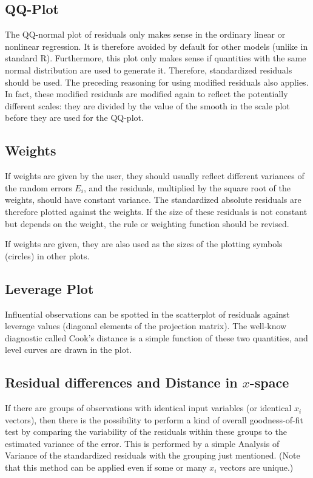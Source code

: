 \documentclass[11pt]{article}\usepackage[]{graphicx}\usepackage[]{color}
\begin{document}
\subsection{QQ-Plot}
The QQ-normal plot of residuals only makes sense in the ordinary linear or
nonlinear regression. It is therefore avoided by default for other models 
(unlike in standard R).
Furthermore, this plot only makes sense if quantities with the same normal
distribution are used to generate it. 
Therefore, standardized residuals should be used.
The preceding reasoning for using modified residuals also applies.
In fact, these modified residuals are modified again to reflect the
potentially different scales: they are divided by the value of the smooth
in the scale plot before they are used for the QQ-plot.

\subsection{Weights}
If weights are given by the user, they should usually reflect different
variances of the random errors $E_i$, and the residuals, multiplied by the
square root of the weights, should have constant variance.
The standardized absolute residuals are therefore plotted against the weights.
If the size of these residuals is not constant but depends on the weight, 
the rule or weighting function should be revised.

If weights are given, they are also used as the sizes of the plotting
symbols (circles) in other plots.

\subsection{Leverage Plot}
Influential observations can be spotted in the scatterplot of residuals
against leverage values (diagonal elements of the projection matrix).
The well-know diagnostic called Cook's distance is a simple function of
these two quantities, and level curves are drawn in the plot.

\subsection{Residual differences and Distance in $x$-space}
If there are groups of observations with identical input variables
(or identical $x_i$ vectors), then there is the possibility to perform a kind
of overall goodness-of-fit test by comparing the variability of the
residuals within these groups to the estimated variance of the error.
This is performed by a simple Analysis of Variance of the standardized 
residuals with the grouping just mentioned. 
(Note that this method can be applied even if some or many $x_i$ vectors 
are unique.)
\end{document}
